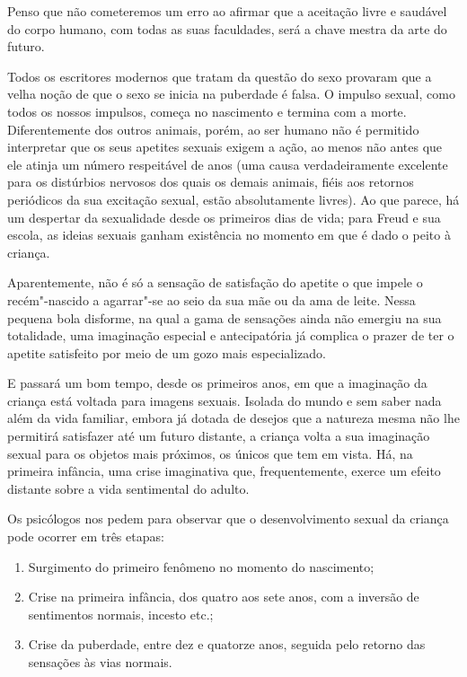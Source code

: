 Penso que não cometeremos um erro ao afirmar que a aceitação livre e
saudável do corpo humano, com todas as suas faculdades, será a chave
mestra da arte do futuro.


Todos os escritores modernos que tratam da questão do sexo provaram que
a velha noção de que o sexo se inicia na puberdade é falsa. O impulso
sexual, como todos os nossos impulsos, começa no nascimento e termina
com a morte. Diferentemente dos outros animais, porém, ao ser humano não é
permitido interpretar que os seus apetites sexuais exigem a ação, ao
menos não antes que ele atinja um número respeitável de anos (uma causa
verdadeiramente excelente para os distúrbios nervosos dos quais os
demais animais, fiéis aos retornos periódicos da sua excitação sexual,
estão absolutamente livres). Ao que parece, há um despertar da
sexualidade desde os primeiros dias de vida; para Freud e sua escola, as
ideias sexuais ganham existência no momento em que é dado o peito à criança.

Aparentemente, não é só a sensação de satisfação do apetite o que
impele o recém"-nascido a agarrar"-se ao seio da sua mãe ou da ama de
leite. Nessa pequena bola disforme, na qual a gama de sensações ainda
não emergiu na sua totalidade, uma imaginação especial e antecipatória
já complica o prazer de ter o apetite satisfeito por meio de um gozo
mais especializado.

E passará um bom tempo, desde os primeiros anos, em que a imaginação da
criança está voltada para imagens sexuais. Isolada do mundo e sem saber
nada além da vida familiar, embora já dotada de desejos que a
natureza mesma não lhe permitirá satisfazer até um futuro distante, a
criança volta a sua imaginação sexual para os objetos mais próximos, os
únicos que tem em vista. Há, na primeira infância, uma crise
imaginativa que, frequentemente, exerce um efeito distante sobre a vida
sentimental do adulto.

Os psicólogos nos pedem para observar que o desenvolvimento sexual da
criança pode ocorrer em três etapas:

\begin{enumerate}
\item Surgimento do primeiro fenômeno no momento do nascimento;

\item Crise na primeira infância, dos quatro aos sete anos, com a inversão de
sentimentos normais, incesto etc.;

\item Crise da puberdade, entre dez e quatorze anos, seguida pelo retorno
das sensações às vias normais.
\end{enumerate}

